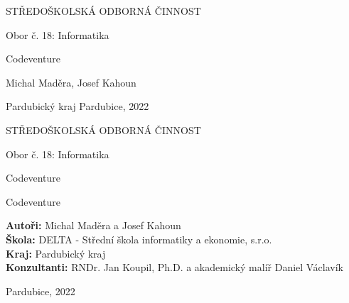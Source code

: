 \begin{titlepage}
    \bfseries{
        \begin{center}
            \LARGE{STŘEDOŠKOLSKÁ ODBORNÁ ČINNOST}

            \vspace{14pt}
            \large{
                Obor č. 18: Informatika
            }

            \vspace{0.4 \textheight}

            \LARGE{
			Codeventure
            }

            \vspace{0.4\textheight}
        \end{center}
        
        \noindent\Large{Michal Maděra, Josef Kahoun}

        \noindent\Large{Pardubický kraj   Pardubice, 2022}
        
            
    }
\end{titlepage}

\cleardoublepage

{\bfseries
    \begin{center}
        \LARGE{STŘEDOŠKOLSKÁ ODBORNÁ ČINNOST}

        \vspace{14pt}
        {\large
            Obor č. 18: Informatika
        }

        \vspace{0.3 \textheight}

        \LARGE{
        Codeventure
        }

        \LARGE{
        Codeventure
        }

        \vspace{0.24\textheight}
    \end{center}  
}
{\Large
    \noindent\textbf{Autoři:} Michal Maděra a Josef Kahoun\\
    \textbf{Škola:} DELTA - Střední škola informatiky a ekonomie, s.r.o.\\
    \textbf{Kraj:} Pardubický kraj\\
    \textbf{Konzultanti:} RNDr. Jan Koupil, Ph.D. a akademický malíř Daniel Václavík\\
}

\noindent Pardubice, 2022

\cleardoublepage

